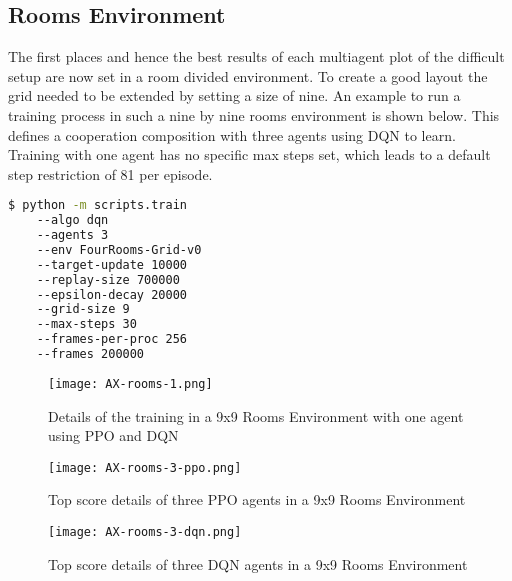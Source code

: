 \subsection{Rooms Environment}
The first places and hence the best results of each multiagent plot of the difficult setup are now set in a room divided environment. To create a good layout the grid needed to be extended by setting a size of nine. An example to run a training process in such a nine by nine rooms environment is shown below. This defines a cooperation composition with three agents using DQN to learn. Training with one agent has no specific max steps set, which leads to a default step restriction of 81 per episode.

\begin{lstlisting}[float=htp,caption=Exemplary command to execute training with three DQN agents in a rooms setup,label=lst:rooms_command,language=bash ,xleftmargin=3ex,xrightmargin=1ex]
$ python -m scripts.train 
    --algo dqn 
    --agents 3
    --env FourRooms-Grid-v0
    --target-update 10000
    --replay-size 700000
    --epsilon-decay 20000
    --grid-size 9
    --max-steps 30
    --frames-per-proc 256
    --frames 200000
\end{lstlisting}

\newpage
\vfill
\begin{figure}
    \centering
    \texttt{[image: AX-rooms-1.png]}\\
    \caption[PPO and DQN Training Details with One Agent in a Rooms Environment]{Details of the training  in a 9x9 Rooms Environment with one agent using PPO and DQN}\label{fig:ax-rooms-1}
\end{figure}
\vfill
\clearpage


\newpage
\vfill
\begin{figure}
    \centering
    \texttt{[image: AX-rooms-3-ppo.png]}\\
    \caption[Training Details of Top PPO Competitive Executions in a Rooms Environment]{Top score details of three PPO agents in a 9x9 Rooms Environment}\label{fig:ax-rooms-3-ppo}
\end{figure}
\vfill
\clearpage


\newpage
\vfill
\begin{figure}
    \centering
    \texttt{[image: AX-rooms-3-dqn.png]}\\
    \caption[Training Details of Top DQN Competitive Executions in a Rooms Environment]{Top score details of three DQN agents in a 9x9 Rooms Environment}\label{fig:ax-rooms-3-dqn}
\end{figure}
\vfill
\clearpage
